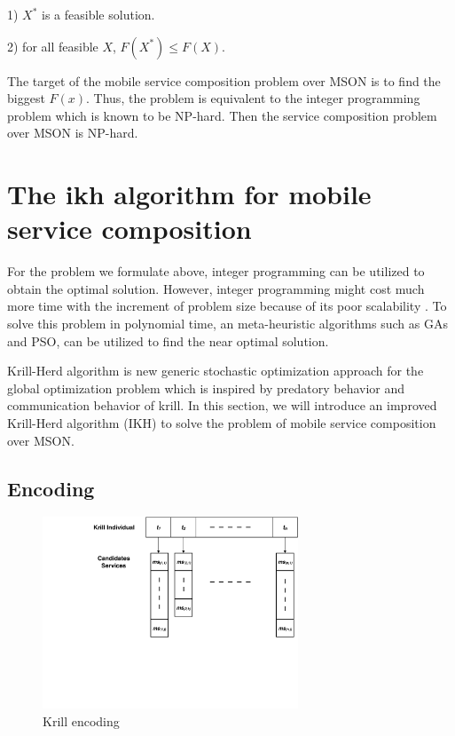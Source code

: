 \documentclass[10pt,journal,compsoc]{IEEEtran}
\begin{document}
1) $X^*$ is a feasible solution.

​2) for all feasible $X$, $F(X^*) \le F(X)$. 

The target of the mobile service composition problem over MSON is to find the biggest $F(x)$. Thus, the problem is equivalent to the integer programming problem which is known to be NP-hard. Then the service composition problem over MSON is NP-hard.

\section{The ikh algorithm for mobile service composition}
For the problem we formulate above, integer programming can be utilized to obtain the optimal solution. However, integer programming might cost much more time with the increment of problem size because of its poor scalability \cite{nemhauser1988integer}. To solve this problem in polynomial time, an meta-heuristic algorithms such as GAs and PSO, can be utilized to find the near optimal solution.

Krill-Herd algorithm \cite{gandomi2012krill} is new generic stochastic optimization approach for the global optimization problem which is inspired by predatory behavior and communication behavior of krill. 
In this section, we will introduce an improved Krill-Herd algorithm (IKH) to solve the problem of mobile service composition over MSON.


\subsection{Encoding}

\begin{figure}[!t]
\centering
\includegraphics[width=3in]{./img/pic4.pdf}
\caption{Krill encoding}
\label{fig_opportunistic}
\end{figure}
\end{document}
